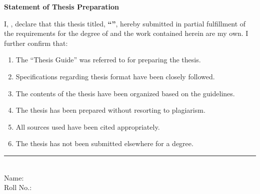 \vspace*{-0.5in}
\begin{center}
	\vspace*{1in}
	\noindent \textbf{\Large Statement of Thesis Preparation}\\
	\vspace*{0.5in}
\end{center}
\noindent I, \textbf{\textsc{\authorname}}, declare that this thesis titled, \textbf{``\textsc{\thesistitle}''}, hereby submitted in partial fulfillment of the requirements for the degree of \textbf{\textsc{\degreename}} and the work contained herein are my own. I further confirm that:
\begin{enumerate}
	\item The ``Thesis Guide'' was referred to for preparing the thesis. 
	\item Specifications regarding thesis format have been closely followed. 
	\item The contents of the thesis have been organized based on the guidelines. 
	\item The thesis has been prepared without resorting to plagiarism. 
	\item All sources used have been cited appropriately. 
	\item The thesis has not been submitted elsewhere for a degree. 
\end{enumerate}
\vspace*{1in}
\rule[2pt]{2in}{0.5pt}\\
Name: \authorname\\
Roll No.: \authorrollno\\
\deptname\\
\noindent\datesubmission